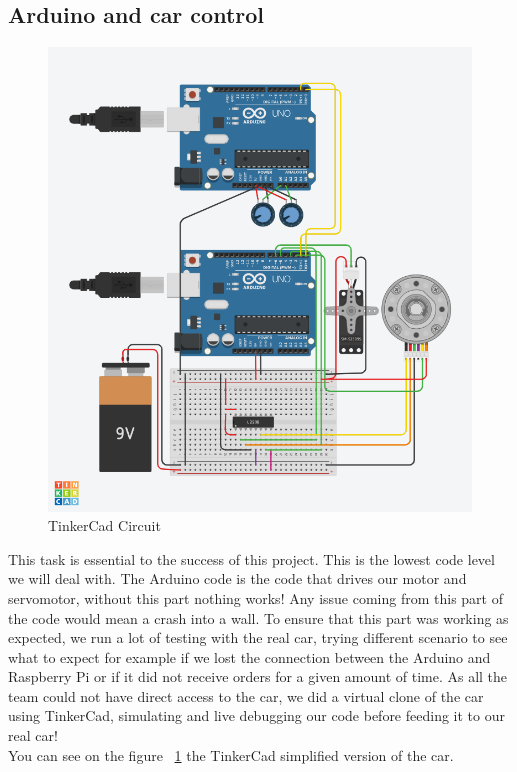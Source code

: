 \documentclass[12pt]{article}
\begin{document}
\newpage

\subsection{Arduino and car control}

\begin{figure}[b!]
    \includegraphics[width=\textwidth]{../../docs/car-hardware.png}
    \caption{TinkerCad Circuit}
    \label{fig:tinkercad}
\end{figure}

This task is essential to the success of this project. This is the lowest code level we will deal with. The Arduino code is the code that drives our motor and servomotor, without this part nothing works! Any issue coming from this part of the code would mean a crash into a wall. To ensure that this part was working as expected, we run a lot of testing with the real car, trying different scenario to see what to expect for example if we lost the connection between the Arduino and Raspberry Pi or if it did not receive orders for a given amount of time. As all the team could not have direct access to the car, we did a virtual clone of the car using TinkerCad, simulating and live debugging our code before feeding it to our real car!\\
You can see on the figure ~\ref{fig:tinkercad} the TinkerCad simplified version of the car.
\end{document}
